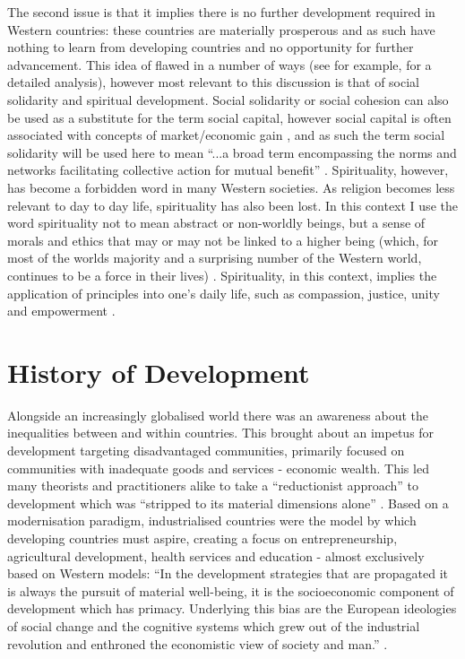  
The second issue is that it implies there is no further development required in Western countries: these countries are materially prosperous and as such have nothing to learn from developing countries and no opportunity for further advancement. This idea of flawed in a number of ways (see for example, \cite{Karlberg2004} for a detailed analysis), however most relevant to this discussion is that of social solidarity and spiritual development. Social solidarity or social cohesion can also be used as a substitute for the term social capital, however social capital is often associated with concepts of market/economic gain \citep{Honeyman2010}, and as such the term social solidarity will be used here to mean “...a broad term encompassing the norms and networks facilitating collective action for mutual benefit” \citep[][p155]{Woolcock1998}. Spirituality, however, has become a forbidden word in many Western societies. As religion becomes less relevant to day to day life, spirituality has also been lost. In this context I use the word spirituality not to mean abstract or non-worldly beings, but a sense of morals and ethics that may or may not be linked to a higher being (which, for most of the worlds majority and a surprising number of the Western world, continues to be a force in their lives)  \citep{Arbab2000}. Spirituality, in this context, implies the application of principles into one's daily life, such as compassion, justice, unity and empowerment \citep{Arbab2000}.



\label{Reflection}
\label{SocialForces}

\section{History of Development}
Alongside an increasingly globalised world there was an awareness about the inequalities between and within countries. This brought about an impetus for development targeting disadvantaged communities, primarily focused on communities with inadequate goods and services - economic wealth. This led many theorists and practitioners alike to take a “reductionist approach” to development which was “stripped to its material dimensions alone” \citep[][p481]{Goulet1980}. Based on a modernisation paradigm, industrialised countries were the model by which developing countries must aspire, creating a focus on entrepreneurship, agricultural development, health services and education - almost exclusively based on Western models: “In the development strategies that are propagated it is always the pursuit of material well-being, it is the socioeconomic component of development which has primacy. Underlying this bias are the European ideologies of social change and the cognitive systems which grew out of the industrial revolution and enthroned the economistic view of society and man.” \citep[][p481]{Goulet1980}. 

